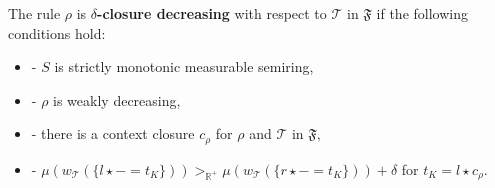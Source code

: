 \begin{definition}
    \noindent
    The rule $\rho$ is
            \textbf{$\delta$-closure decreasing} with respect to $\mathcal{T}$ in $\mathfrak{F}$ if the following conditions hold:
            \begin{itemize}
                \item[]- $S$ is strictly monotonic measurable semiring,
                \item[]- $\rho$ is weakly decreasing,
                \item[]- there is a context closure $c_\rho$ for $\rho$ and $\mathcal{T}$ in $\mathfrak{F}$,
                \item[]- $ \mu(w_\mathcal{T}(\{l \mathop{\star} - \mathop{=} t_K\}))  >_{\mathbb{R}^+}  \mu(w_\mathcal{T}(\{r \mathop{\star} - \mathop{=} t_K\})) \mathop{+}\delta$ for $t_K \mathop{=} l \mathop{\star} c_\rho$.
            \end{itemize}
\end{definition}

